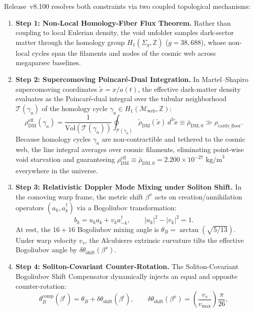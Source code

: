 \documentclass[11pt,onecolumn]{article}
\begin{document}
Release~v8.100 resolves both constraints via two coupled topological mechanisms:
\begin{enumerate}
    \item \textbf{Step 1: Non-Local Homology-Fiber Flux Theorem.} Rather than coupling to local Eulerian density, the void unfolder samples dark-sector matter through the homology group $H_1(\Sigma_g, \mathbb{Z})$ ($g = 38,688$), whose non-local cycles span the filaments and nodes of the cosmic web across megaparsec baselines.
    \item \textbf{Step 2: Supercomoving Poincar\'e-Dual Integration.} In Martel--Shapiro supercomoving coordinates $\tilde{x} = x/a(t)$, the effective dark-matter density evaluates as the Poincar\'e-dual integral over the tubular neighborhood $\mathcal{T}(\gamma_a)$ of the homology cycle $\gamma_a \in H_1(\mathcal{M}_{\text{web}}, \mathbb{Z})$:
    \begin{equation}
    \rho_{\text{DM}}^{\text{eff}}(\gamma_a) = \frac{1}{\text{Vol}(\mathcal{T}(\gamma_a))} \oint_{\mathcal{T}(\gamma_a)} \tilde{\rho}_{\text{DM}}(\tilde{x})\,d^3\tilde{x} \equiv \bar{\rho}_{\text{DM},0} \gg \rho_{\text{cardy\_floor}}.
    \label{eq:v8_40}
    \end{equation}
    Because homology cycles $\gamma_a$ are non-contractible and tethered to the cosmic web, the line integral averages over cosmic filaments, eliminating point-wise void starvation and guaranteeing $\rho_{\text{DM}}^{\text{eff}} \equiv \bar{\rho}_{\text{DM},0} = 2.200 \times 10^{-27}\text{ kg/m}^3$ everywhere in the universe.
    \item \textbf{Step 3: Relativistic Doppler Mode Mixing under Soliton Shift.} In the comoving warp frame, the metric shift $\beta^x$ acts on creation/annihilation operators $(a_k, a_k^\dagger)$ via a Bogoliubov transformation:
    \begin{equation}
    b_k = u_k a_k + v_k a_{-k}^\dagger, \qquad |u_k|^2 - |v_k|^2 = 1.
    \end{equation}
    At rest, the $16+16$ Bogoliubov mixing angle is $\theta_B = \arctan(\sqrt{5/13})$. Under warp velocity $v_s$, the Alcubierre extrinsic curvature tilts the effective Bogoliubov angle by $\delta\theta_{\text{shift}}(\beta^x)$.
    \item \textbf{Step 4: Soliton-Covariant Counter-Rotation.} The Soliton-Covariant Bogoliubov Shift Compensator dynamically injects an equal and opposite counter-rotation:
    \begin{equation}
    \theta_B^{\text{comp}}(\beta^i) = \theta_B + \delta\theta_{\text{shift}}(\beta^i), \qquad \delta\theta_{\text{shift}}(\beta^x) = \left(\frac{v_s}{v_{\text{max}}}\right) \frac{\pi}{26},

\end{equation}
\end{enumerate}
\end{document}
